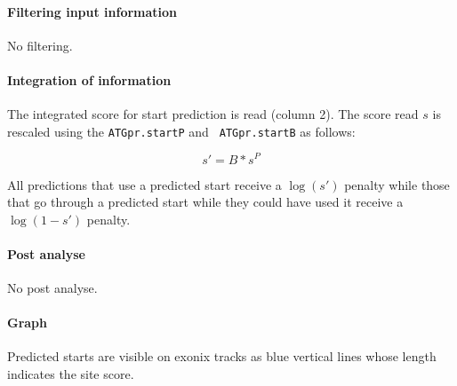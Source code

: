 \paragraph{Filtering input information}

No filtering.

\paragraph{Integration of information}

The integrated score for start prediction is read (column 2).  The
score read $s$ is rescaled using the {\tt ATGpr.startP} and {\tt
ATGpr.startB} as follows:

\[s' = B*s^P\]

All predictions that use a predicted start receive a $\log(s')$
penalty while those that go through a predicted start while they
could have used it receive a $\log(1-s')$ penalty.


\paragraph{Post analyse}

No post analyse.

\paragraph{Graph}

Predicted starts are visible on exonix tracks as blue vertical lines
whose length indicates the site score.
